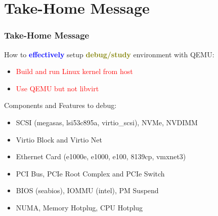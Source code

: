 \documentclass[aspectratio=169]{beamer}
\begin{document}

\section{Take-Home Message}
\begin{frame}
\frametitle{Take-Home Message}
{\Large How to \textbf{\textcolor{blue}{effectively}} setup \textbf{\textcolor{olive}{debug/study}} environment with QEMU:}
\begin{itemize}
\item {\Large \textcolor{red}{Build and run Linux kernel from host}}
\item {\Large \textcolor{red}{Use QEMU but not libvirt}}
\end{itemize}

\vspace{4 mm}

{\Large Components and Features to debug:}
\begin{itemize}
\item SCSI (megasas, lsi53c895a, virtio\_scsi), NVMe, NVDIMM
\item Virtio Block and Virtio Net
\item Ethernet Card (e1000e, e1000, e100, 8139cp, vmxnet3)
\item PCI Bus, PCIe Root Complex and PCIe Switch
\item BIOS (seabios), IOMMU (intel), PM Suspend
\item NUMA, Memory Hotplug, CPU Hotplug
\end{itemize}
\end{frame}

\end{document}
